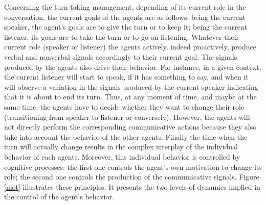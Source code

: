 Concerning the turn-taking management, depending of its current role in the conversation, the current goals of the agents are as follows: being the current speaker, the agent's goals are to give the turn or to keep it; being the current listener, its goals are to take the turn or to go on listening. Whatever their current role (speaker or listener) the agents actively, indeed proactively, produce verbal and nonverbal signals accordingly to their current goal. 
The signals produced by the agents also drive their behavior. For instance, in a given context, the current listener will start to speak, if it has something to say, and when it will observe a variation in the signals produced by the current speaker indicating that it is about to end its turn. 
Thus, at any moment of time, and maybe at the same time, the agents have to decide whether they want to change their role (transitioning from speaker to listener or conversely). However, the agents will not directly perform the corresponding communicative actions because they also take into account the behavior of the other agents. 
Finally the time when the turn will actually change results in the complex interplay of the individual behavior of each agents. Moreover, this individual behavior is controlled by cognitive processes: the first one controls the agent's own motivation to change its role; the second one controls the production of the communicative signals. 
Figure \ref{mot} illustrates these principles. It presents the two levels of dynamics implied in the control of the agent's behavior.


